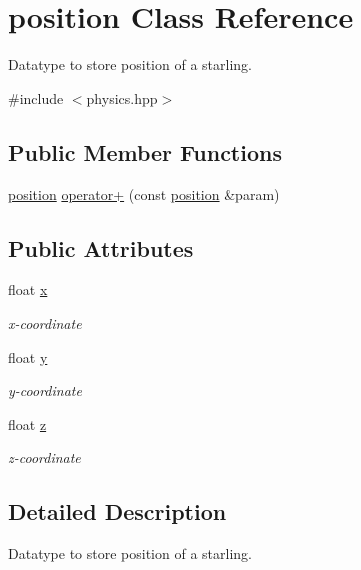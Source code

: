\hypertarget{classposition}{}\section{position Class Reference}
\label{classposition}


Datatype to store position of a starling.  




{\ttfamily \#include $<$physics.\+hpp$>$}

\subsection*{Public Member Functions}
\begin{DoxyCompactItemize}
\item 
\mbox{\hyperlink{classposition}{position}} \mbox{\hyperlink{classposition_a6ddbf7075ea3cda800a544e395fc1524}{operator+}} (const \mbox{\hyperlink{classposition}{position}} \&param)
\end{DoxyCompactItemize}
\subsection*{Public Attributes}
\begin{DoxyCompactItemize}
\item 
float \mbox{\hyperlink{classposition_a0019a0a4cc8203a3f24a6f32566bbbd1}{x}}
\begin{DoxyCompactList}\small\item\em x-\/coordinate \end{DoxyCompactList}\item 
float \mbox{\hyperlink{classposition_a1e0761bc9863e892ba24261551655313}{y}}
\begin{DoxyCompactList}\small\item\em y-\/coordinate \end{DoxyCompactList}\item 
float \mbox{\hyperlink{classposition_a9f6e4f705facb726a89fa289d20daf1a}{z}}
\begin{DoxyCompactList}\small\item\em z-\/coordinate \end{DoxyCompactList}\end{DoxyCompactItemize}


\subsection{Detailed Description}
Datatype to store position of a starling. 

